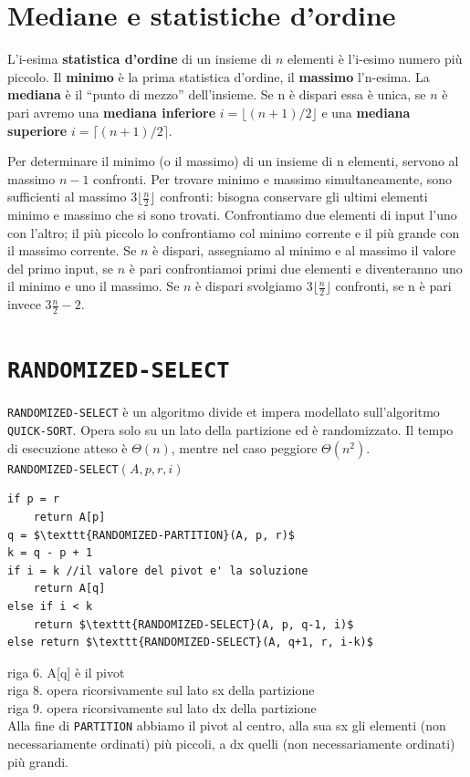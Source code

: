 \documentclass[11pt,a4paper]{article}
\begin{document}
\section{Mediane e statistiche d'ordine}
L’i-esima \textbf{statistica d’ordine} di un insieme di $n$ elementi è l’i-esimo numero più piccolo.
Il \textbf{minimo} è la prima statistica d’ordine, il \textbf{massimo} l’n-esima.
La \textbf{mediana} è il “punto di mezzo” dell’insieme. Se n è dispari essa è unica, se $n$ è pari avremo una \textbf{mediana
inferiore} $i = \lfloor(n + 1)/2\rfloor$ e una \textbf{mediana superiore} $i = \lceil(n + 1)/2\rceil$.

Per determinare il minimo (o il massimo) di un insieme di n elementi, servono al massimo $n-1$ confronti.
Per trovare minimo e massimo simultaneamente, sono sufficienti al massimo $3\lfloor \frac{n}{2} \rfloor$ confronti: bisogna
conservare gli ultimi elementi minimo e massimo che si sono trovati. Confrontiamo due elementi di input
l’uno con l’altro; il più piccolo lo confrontiamo col minimo corrente e il più grande con il massimo corrente.
Se $n$ è dispari, assegniamo al minimo e al massimo il valore del primo input, se $n$ è pari confrontiamoi primi
due elementi e diventeranno uno il minimo e uno il massimo.
Se $n$ è dispari svolgiamo $3\lfloor \frac{n}{2} \rfloor$ confronti, se n è pari invece $3 \frac{n}{2}-2$.

\section{\texttt{RANDOMIZED-SELECT}}
\texttt{RANDOMIZED-SELECT} è un algoritmo divide et impera modellato sull’algoritmo \texttt{QUICK-SORT}. Opera solo su
un lato della partizione ed è randomizzato. Il tempo di esecuzione atteso è $\Theta(n)$, mentre nel caso peggiore $\Theta(n^2).$\medskip\\
\texttt{RANDOMIZED-SELECT}$(A, p, r, i)$
\begin{lstlisting}[mathescape=true]
if p = r
    return A[p]
q = $\texttt{RANDOMIZED-PARTITION}(A, p, r)$
k = q - p + 1
if i = k //il valore del pivot e' la soluzione
    return A[q]
else if i < k
    return $\texttt{RANDOMIZED-SELECT}(A, p, q-1, i)$
else return $\texttt{RANDOMIZED-SELECT}(A, q+1, r, i-k)$
\end{lstlisting}
riga 6. A[q] è il pivot\\
riga 8. opera ricorsivamente sul lato sx della partizione\\
riga 9. opera ricorsivamente sul lato dx della partizione\medskip\\
Alla fine di \texttt{PARTITION} abbiamo il pivot al centro, alla sua sx gli elementi (non necessariamente ordinati) più piccoli, a
dx quelli (non necessariamente ordinati) più grandi.
\end{document}
